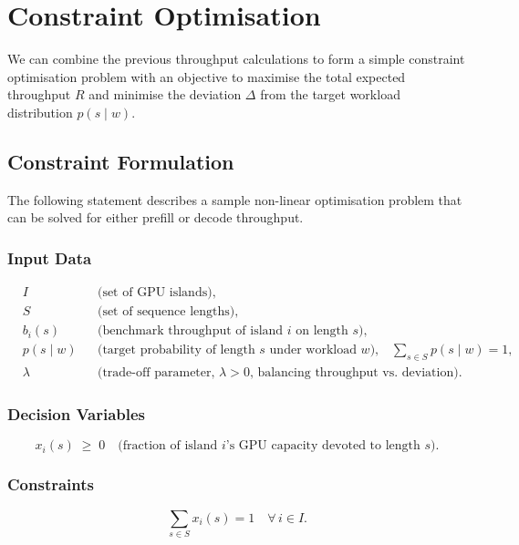 \section{Constraint Optimisation}
\label{chap:constraint-optimisation}

We can combine the previous throughput calculations to form a simple constraint optimisation problem with an objective to maximise the total expected throughput $R$ and minimise the deviation $\Delta$ from the target workload distribution $p(s\mid w)$.

\subsection{Constraint Formulation}

The following statement describes a sample non-linear optimisation problem that can be solved for either prefill or decode throughput.

\subsubsection*{Input Data}
\[
\begin{aligned}
& I &&\text{(set of GPU islands)},\\
& S &&\text{(set of sequence lengths)},\\
& b_i(s) &&\text{(benchmark throughput of island \(i\) on length \(s\))},\\
& p(s\mid w) &&\text{(target probability of length \(s\) under workload \(w\)),}
\quad \sum_{s\in S}p(s\mid w)=1,\\
& \lambda &&\text{(trade-off parameter, $\lambda>0$, balancing throughput vs.\ deviation)}.
\end{aligned}
\]

\subsubsection*{Decision Variables}
\[
x_i(s)\;\ge\;0
\quad\text{(fraction of island \(i\)'s GPU capacity devoted to length \(s\))}.
\]

\subsubsection*{Constraints}
\[
\sum_{s\in S}x_i(s)=1
\quad\forall\,i\in I.
\]

